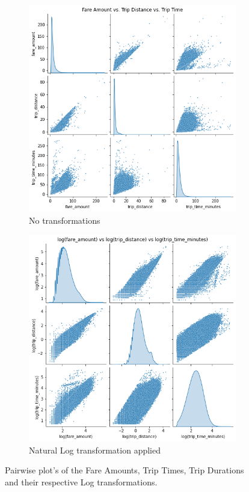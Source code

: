 \documentclass[11pt]{article}
\begin{document}
\begin{figure}[H]
     \centering
     \begin{subfigure}[b]{0.45\textwidth}
         \centering
         \includegraphics[width=\textwidth]{features_pairplot.png}
         \caption{No transformations}
         \label{fig:y equals x}
     \end{subfigure}
     \hfill
     \begin{subfigure}[b]{0.45\textwidth}
         \centering
         \includegraphics[width=\textwidth]{log_features_pairplot.png}
         \caption{Natural Log transformation applied}
         \label{fig:three sin x}
     \end{subfigure}
        \caption{Pairwise plot's of the Fare Amounts, Trip Times, Trip Durations and their respective Log transformations.}
        \label{fig:pairplots}
\end{figure}
\end{document}
